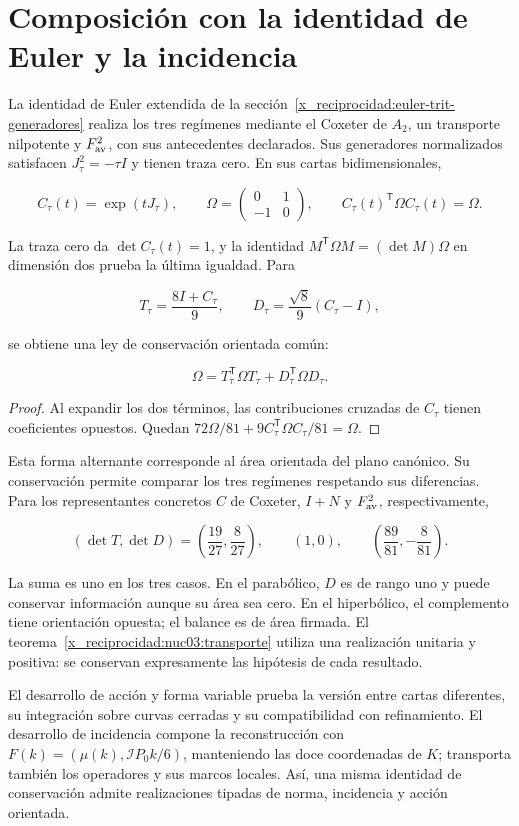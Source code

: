 \section{Composición con la identidad de Euler y la incidencia}

La identidad de Euler extendida de la sección~\ref{x_reciprocidad:euler-trit-generadores} realiza los tres regímenes mediante el Coxeter de \(A_2\), un transporte nilpotente y \(F_{\rm av}^2\), con sus antecedentes declarados. Sus generadores normalizados satisfacen \(J_\tau^2=-\tau I\) y tienen traza cero. En sus cartas bidimensionales,

\[
C_\tau(t)=\exp(tJ_\tau),\qquad
\Omega=\begin{pmatrix}0&1\\-1&0\end{pmatrix},\qquad
C_\tau(t)^\mathsf T\Omega C_\tau(t)=\Omega.
\]

La traza cero da \(\det C_\tau(t)=1\), y la identidad \(M^\mathsf T\Omega M=(\det M)\Omega\) en dimensión dos prueba la última igualdad. Para

\[
T_\tau=\frac{8I+C_\tau}{9},\qquad
D_\tau=\frac{\sqrt8}{9}(C_\tau-I),
\]

se obtiene una ley de conservación orientada común:

\begin{equation}
\boxed{\Omega=T_\tau^\mathsf T\Omega T_\tau+D_\tau^\mathsf T\Omega D_\tau.}
\label{x_reciprocidad:nuc03:eq:22}
\end{equation}

\begin{proof}
Al expandir los dos términos, las contribuciones cruzadas de \(C_\tau\) tienen coeficientes opuestos. Quedan \(72\Omega/81+9C_\tau^\mathsf T\Omega C_\tau/81=\Omega\).
\end{proof}

Esta forma alternante corresponde al área orientada del plano canónico. Su conservación permite comparar los tres regímenes respetando sus diferencias. Para los representantes concretos \(C\) de Coxeter, \(I+N\) y \(F_{\rm av}^2\), respectivamente,

\begin{equation}
(\det T,\det D)=
\left(\frac{19}{27},\frac8{27}\right),\qquad
(1,0),\qquad
\left(\frac{89}{81},-\frac8{81}\right).
\label{x_reciprocidad:nuc03:eq:23}
\end{equation}

La suma es uno en los tres casos. En el parabólico, \(D\) es de rango uno y puede conservar información aunque su área sea cero. En el hiperbólico, el complemento tiene orientación opuesta; el balance es de área firmada. El teorema~\ref{x_reciprocidad:nuc03:transporte} utiliza una realización unitaria y positiva: se conservan expresamente las hipótesis de cada resultado.

El desarrollo de acción y forma variable prueba la versión entre cartas diferentes, su integración sobre curvas cerradas y su compatibilidad con refinamiento. El desarrollo de incidencia compone la reconstrucción con \(F(k)=(\mu(k),\mathcal I P_0k/6)\), manteniendo las doce coordenadas de \(K\); transporta también los operadores y sus marcos locales. Así, una misma identidad de conservación admite realizaciones tipadas de norma, incidencia y acción orientada.
